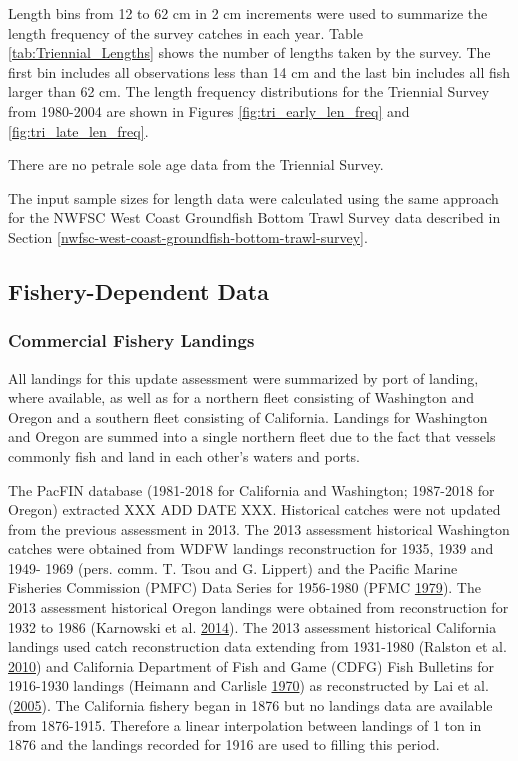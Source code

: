 \documentclass[12pt,]{article}
\begin{document}
Length bins from 12 to 62 cm in 2 cm increments were used to summarize
the length frequency of the survey catches in each year. Table
\ref{tab:Triennial_Lengths} shows the number of lengths taken by the
survey. The first bin includes all observations less than 14 cm and the
last bin includes all fish larger than 62 cm. The length frequency
distributions for the Triennial Survey from 1980-2004 are shown in
Figures \ref{fig:tri_early_len_freq} and \ref{fig:tri_late_len_freq}.

There are no petrale sole age data from the Triennial Survey.

The input sample sizes for length data were calculated using the same
approach for the NWFSC West Coast Groundfish Bottom Trawl Survey data
described in Section
\ref{nwfsc-west-coast-groundfish-bottom-trawl-survey}.

\subsection{Fishery-Dependent Data}\label{fishery-dependent-data}

\subsubsection{Commercial Fishery
Landings}\label{commercial-fishery-landings}

All landings for this update assessment were summarized by port of
landing, where available, as well as for a northern fleet consisting of
Washington and Oregon and a southern fleet consisting of California.
Landings for Washington and Oregon are summed into a single northern
fleet due to the fact that vessels commonly fish and land in each
other's waters and ports.

The PacFIN database (1981-2018 for California and Washington; 1987-2018
for Oregon) extracted XXX ADD DATE XXX. Historical catches were not
updated from the previous assessment in 2013. The 2013 assessment
historical Washington catches were obtained from WDFW landings
reconstruction for 1935, 1939 and 1949- 1969 (pers. comm. T. Tsou and G.
Lippert) and the Pacific Marine Fisheries Commission (PMFC) Data Series
for 1956-1980 (PFMC \protect\hyperlink{ref-pfmc_data_1979}{1979}). The
2013 assessment historical Oregon landings were obtained from
reconstruction for 1932 to 1986 (Karnowski et al.
\protect\hyperlink{ref-karnowski_historical_2014}{2014}). The 2013
assessment historical California landings used catch reconstruction data
extending from 1931-1980 (Ralston et al.
\protect\hyperlink{ref-ralston_documentation_2010}{2010}) and California
Department of Fish and Game (CDFG) Fish Bulletins for 1916-1930 landings
(Heimann and Carlisle
\protect\hyperlink{ref-heimann_pacific_1970}{1970}) as reconstructed by
Lai et al. (\protect\hyperlink{ref-lai_stock_2005}{2005}). The
California fishery began in 1876 but no landings data are available from
1876-1915. Therefore a linear interpolation between landings of 1 ton in
1876 and the landings recorded for 1916 are used to filling this period.
\end{document}
